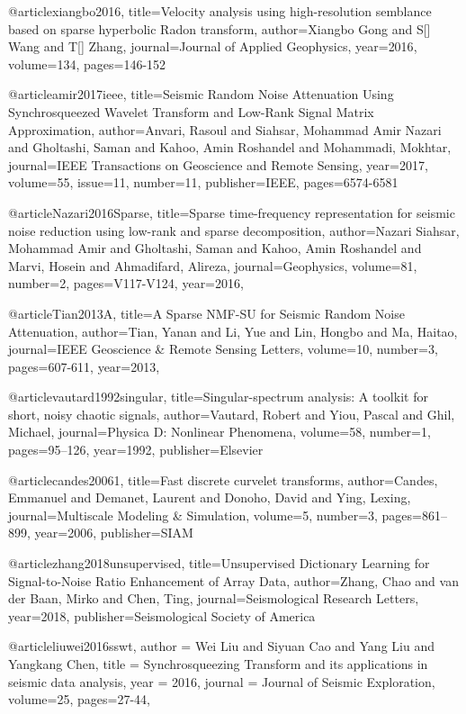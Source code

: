 @article{xiangbo2016,
  title={Velocity analysis using high-resolution semblance based on sparse hyperbolic Radon transform},
  author={Xiangbo Gong and S[] Wang and T[] Zhang},
  journal={Journal of Applied Geophysics},
  year={2016},
  volume=134,
  pages={146-152}
}



@article{amir2017ieee,
  title={Seismic Random Noise Attenuation Using Synchrosqueezed Wavelet Transform and Low-Rank Signal Matrix Approximation},
  author={Anvari, Rasoul and Siahsar, Mohammad Amir Nazari and Gholtashi, Saman and Kahoo, Amin Roshandel and Mohammadi, Mokhtar},
  journal={IEEE Transactions on Geoscience and Remote Sensing},
  year={2017},
  volume=55,
  issue=11,
  number=11,
  publisher={IEEE},
  pages={6574-6581}
}

@article{Nazari2016Sparse,
  title={Sparse time-frequency representation for seismic noise reduction using low-rank and sparse decomposition},
  author={Nazari Siahsar, Mohammad Amir and Gholtashi, Saman and Kahoo, Amin Roshandel and Marvi, Hosein and Ahmadifard, Alireza},
  journal={Geophysics},
  volume={81},
  number={2},
  pages={V117-V124},
  year={2016},
}

@article{Tian2013A,
  title={A Sparse NMF-SU for Seismic Random Noise Attenuation},
  author={Tian, Yanan and Li, Yue and Lin, Hongbo and Ma, Haitao},
  journal={IEEE Geoscience \& Remote Sensing Letters},
  volume={10},
  number={3},
  pages={607-611},
  year={2013},
}


@article{vautard1992singular,
  title={Singular-spectrum analysis: A toolkit for short, noisy chaotic signals},
  author={Vautard, Robert and Yiou, Pascal and Ghil, Michael},
  journal={Physica D: Nonlinear Phenomena},
  volume={58},
  number={1},
  pages={95--126},
  year={1992},
  publisher={Elsevier}
}


@article{candes20061,
  title={Fast discrete curvelet transforms},
  author={Candes, Emmanuel and Demanet, Laurent and Donoho, David and Ying, Lexing},
  journal={Multiscale Modeling \& Simulation},
  volume={5},
  number={3},
  pages={861--899},
  year={2006},
  publisher={SIAM}
}

@article{zhang2018unsupervised,
  title={Unsupervised Dictionary Learning for Signal-to-Noise Ratio Enhancement of Array Data},
  author={Zhang, Chao and van der Baan, Mirko and Chen, Ting},
  journal={Seismological Research Letters},
  year={2018},
  publisher={Seismological Society of America}
}


@article{liuwei2016sswt,
  author =	 {Wei Liu and Siyuan Cao and Yang Liu and Yangkang Chen},
  title =	 {Synchrosqueezing Transform and its applications in seismic data analysis},
  year =	 2016,
  journal =	 {Journal of Seismic Exploration},
  volume={25},
 pages={27-44},
}

